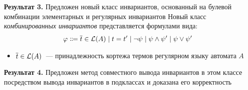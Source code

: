 \begin{frame}{\textbf{Результат 3.} Предложен новый класс инвариантов, основанный на булевой комбинации элементарных и регулярных инвариантов}
Новый класс \emph{комбинированных инвариантов} представляется формулами вида:
$$\varphi \Coloneqq \overline{t}\in \mathcal{L}(A) \mid t = t' \mid \neg\psi \mid \psi \land \psi' \mid \psi \lor \psi'$$
\vspace*{-8mm}
\begin{itemize}
    \item $\overline{t}\in \mathcal{L}(A)$~--- принадлежность кортежа термов регулярном языку автомата $A$
\end{itemize}
\end{frame}

\begin{frame}{\textbf{Результат 4.} Предложен метод совместного вывода инвариантов в этом классе посредством вывода инвариантов в подклассах и доказана его корректность}
\whenFullCompile{\centering\ciciPic}
\end{frame}

